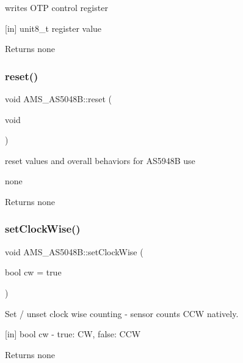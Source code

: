 writes O\+TP control register 

\mbox{[}in\mbox{]} unit8\+\_\+t register value \begin{DoxyReturn}{Returns}
none 
\end{DoxyReturn}
\mbox{\label{classAMS__AS5048B_a7f2a933875b46cf63eb29137c63dd11f}} 
\subsubsection{\texorpdfstring{reset()}{reset()}}
{\footnotesize\ttfamily void A\+M\+S\+\_\+\+A\+S5048\+B\+::reset (\begin{DoxyParamCaption}\item[{void}]{ }\end{DoxyParamCaption})}



reset values and overall behaviors for A\+S5948B use 

none \begin{DoxyReturn}{Returns}
none 
\end{DoxyReturn}
\mbox{\label{classAMS__AS5048B_a7f80205c1b980e90a13482c72711e62d}} 
\subsubsection{\texorpdfstring{set\+Clock\+Wise()}{setClockWise()}}
{\footnotesize\ttfamily void A\+M\+S\+\_\+\+A\+S5048\+B\+::set\+Clock\+Wise (\begin{DoxyParamCaption}\item[{bool}]{cw = {\ttfamily true} }\end{DoxyParamCaption})}



Set / unset clock wise counting -\/ sensor counts C\+CW natively. 

\mbox{[}in\mbox{]} bool cw -\/ true\+: CW, false\+: C\+CW \begin{DoxyReturn}{Returns}
none 
\end{DoxyReturn}
\mbox{\label{classAMS__AS5048B_ad67ba3de9224a12102a31b35829450e8}} 
